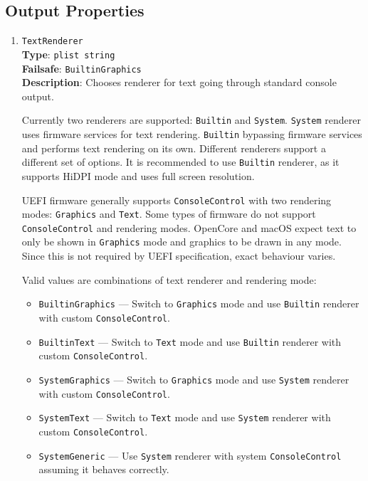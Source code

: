 \documentclass[]{article}
\providecommand{\tightlist}{%
  \setlength{\itemsep}{0pt}\setlength{\parskip}{0pt}}
\begin{document}
\subsection{Output Properties}\label{uefioutputprops}

\begin{enumerate}

\item
  \texttt{TextRenderer}\\
  \textbf{Type}: \texttt{plist\ string}\\
  \textbf{Failsafe}: \texttt{BuiltinGraphics}\\
  \textbf{Description}: Chooses renderer for text going through standard
  console output.

  Currently two renderers are supported: \texttt{Builtin} and
  \texttt{System}. \texttt{System} renderer uses firmware services
  for text rendering. \texttt{Builtin} bypassing firmware services
  and performs text rendering on its own. Different renderers support
  a different set of options. It is recommended to use \texttt{Builtin}
  renderer, as it supports HiDPI mode and uses full screen resolution.

  UEFI firmware generally supports \texttt{ConsoleControl} with two
  rendering modes: \texttt{Graphics} and \texttt{Text}. Some types of firmware
  do not support \texttt{ConsoleControl} and rendering modes. OpenCore
  and macOS expect text to only be shown in \texttt{Graphics} mode and
  graphics to be drawn in any mode. Since this is not required by UEFI
  specification, exact behaviour varies.

  Valid values are combinations of text renderer and rendering mode:

  \begin{itemize}
  \tightlist
  \item \texttt{BuiltinGraphics} --- Switch to \texttt{Graphics}
    mode and use \texttt{Builtin} renderer with
    custom \texttt{ConsoleControl}.
  \item \texttt{BuiltinText} --- Switch to \texttt{Text}
    mode and use \texttt{Builtin} renderer with
    custom \texttt{ConsoleControl}.
  \item \texttt{SystemGraphics} --- Switch to \texttt{Graphics}
    mode and use \texttt{System} renderer with
    custom \texttt{ConsoleControl}.
  \item \texttt{SystemText} --- Switch to \texttt{Text}
    mode and use \texttt{System} renderer with
    custom \texttt{ConsoleControl}.
  \item \texttt{SystemGeneric} --- Use \texttt{System} renderer with
    system \texttt{ConsoleControl} assuming it behaves correctly.
  \end{itemize}


\end{enumerate}
\end{document}

